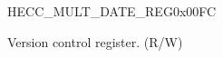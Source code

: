 \begin{register}{H}{ECC\_MULT\_DATE\_REG}{0x00FC}\label{regdesc:ECCMULTDATEREG}
%
%
\regnewline%
\begin{regdesc}\begin{reglist}
\label{fielddesc:ECCMULTDATE}\item [ECC\_MULT\_DATE] Version control register. (R/W)
\end{reglist}\end{regdesc}
\end{register}
